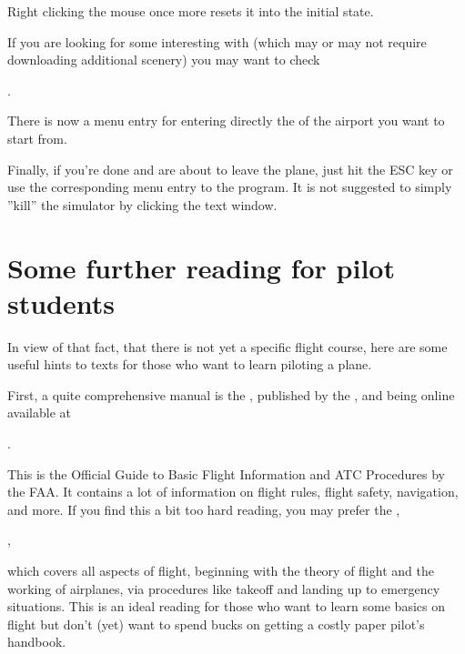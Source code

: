  Right clicking the mouse once more resets it into the initial state.

If you are looking for some interesting  with \FlightGear{}
(which may or may not require downloading additional scenery) you may want to check
 \medskip

 .
  \medskip

\noindent
 There is now a menu entry for entering directly the  of the
airport you want to start from.

Finally, if you're done and are about to leave the plane, just hit the ESC key or use the
corresponding menu entry to  the program. It is not suggested to simply
''kill'' the simulator by clicking the text window.

\section{Some further reading for pilot students\label{flightschoool}}

In view of that fact, that there is not yet a \FlightGear{} specific flight course, here
are some useful hints to texts for those who want to learn piloting a plane.

First, a quite comprehensive manual is the ,
published by the , and being online available at
\medskip

.
\medskip

 \noindent
This is the Official Guide to Basic Flight Information and ATC Procedures by the FAA. It
contains a lot of information on flight rules, flight safety, navigation, and more. If
you find this a bit too hard reading, you may prefer the ,
\medskip

,
\medskip

 \noindent
which covers all aspects of flight, beginning with the theory of flight and the working
of airplanes, via procedures like takeoff and landing up to emergency situations. This is
an ideal reading for those who want to learn some basics on flight but don't (yet) want
to spend bucks on getting a costly paper pilot's handbook.

